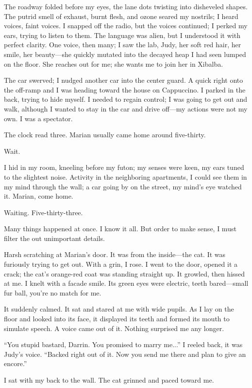 The roadway folded before my eyes, the lane dots twisting into
disheveled shapes. The putrid smell of exhaust, burnt flesh, and ozone
seared my nostrils; I heard voices, faint voices. I snapped off the
radio, but the voices continued; I perked my ears, trying to listen to
them. The language was alien, but I understood it with perfect clarity.
One voice, then many; I saw the lab, Judy, her soft red hair, her smile,
her beauty---she quickly mutated into the decayed heap I had seen lumped
on the floor. She reaches out for me; she wants me to join her in
Xibalba.

The car swerved; I nudged another car into the center guard. A quick
right onto the off-ramp and I was heading toward the house on
Cappuccino. I parked in the back, trying to hide myself. I needed to
regain control; I was going to get out and walk, although I wanted to
stay in the car and drive off---my actions were not my own. I was a
spectator.

The clock read three. Marian usually came home around five-thirty.

Wait.

I hid in my room, kneeling before my futon; my senses were keen, my ears
tuned to the slightest noise. Activity in the neighboring apartments, I
could see them in my mind through the wall; a car going by on the
street, my mind's eye watched it. Marian, come home.

Waiting. Five-thirty-three.

Many things happened at once. I know it all. But order to make sense, I
must filter the out unimportant details.

Harsh scratching at Marian's door. It was from the inside---the cat. It
was furiously trying to get out. With a grin, I rose. I went to the
door, opened it a crack; the cat's orange-red coat was standing straight
up. It growled, then hissed at me. I knelt with a facade smile. Its
green eyes were electric, teeth bared---small fur ball, you're no match
for me.

It suddenly calmed. It sat and stared at me with wide pupils. As I lay
on the floor and looked into its face, it displayed its teeth and formed
its mouth to simulate speech. A voice came out of it. Nothing surprised
me any longer.

``You stupid bastard, Darrin. You promised to marry me...'' I reeled
back, it was Judy's voice. ``Backed right out of it. Now you send me
there and plan to give an encore.''

I sat with my back to the wall. The cat grinned and paced toward me.

